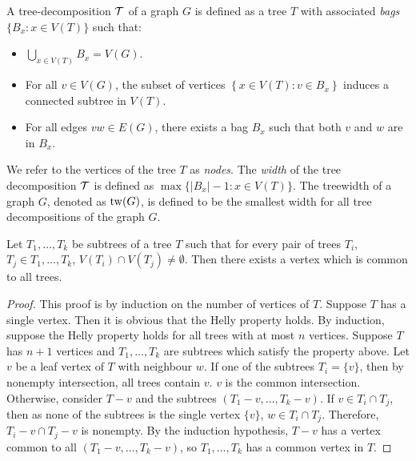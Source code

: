 \begin{definition}\label{def:tree-decomposition}
	A tree-decomposition \(\mathcal{T}\) of a graph \(G\) is defined as a tree \(T\) with associated \textit{bags} \(\lbrace B_x : x \in V(T) \rbrace\) such that:
	\begin{itemize}
		\item $\bigcup_{x \in V(T)} B_x = V(G)$.
		\item For all \(v \in V(G)\), the subset of vertices \(\left\lbrace x \in V(T): v \in B_x \right\rbrace\) induces a connected subtree in \(V(T)\).
		\item For all edges \(vw \in E(G)\), there exists a bag \(B_x\) such that both \(v\) and \(w\) are in \(B_x\).
	\end{itemize}
\end{definition}
We refer to the vertices of the tree \(T\) as \textit{nodes}.
The \textit{width} of the tree decomposition \(\mathcal{T}\) is defined as \(\max \lbrace |B_x| - 1 : x \in V(T) \rbrace\).
The treewidth of a graph \(G\), denoted as \(\operatorname{tw}(G)\), is defined to be the smallest width for all tree decompositions of the graph \(G\).

\begin{lemma}\label{lem:Helly}
	Let \(T_1, \ldots, T_k\) be subtrees of a tree \(T\) such that for every pair of trees $T_i$, $T_j \in T_1, \ldots, T_k$, $V(T_i) \cap V(T_j) \neq \emptyset$. Then there exists a vertex which is common to all trees.
\end{lemma}
\begin{proof}
	This proof is by induction on the number of vertices of $T$. Suppose $T$ has a single vertex. Then it is obvious that the Helly property holds. By induction, suppose the Helly property holds for all trees with at most $n$ vertices. Suppose $T$ has $n + 1$ vertices and \(T_1, \ldots, T_k\) are subtrees which satisfy the property above. Let $v$ be a leaf vertex of $T$ with neighbour $w$. If one of the subtrees $T_i = \{v\}$, then by nonempty intersection, all trees contain $v$. $v$ is the common intersection. Otherwise, consider $T - v$ and the subtrees $(T_1 - v, \ldots, T_k - v)$. If $v \in T_i \cap T_j$, then as none of the subtrees is the single vertex $\{v\}$, $w \in T_i \cap T_j$. Therefore, $T_i - v \cap T_j - v$ is nonempty. By the induction hypothesis, $T - v$ has a vertex common to all $(T_1 - v, \ldots, T_k - v)$, so \(T_1, \ldots, T_k\) has a common vertex in $T$. 
\end{proof}

